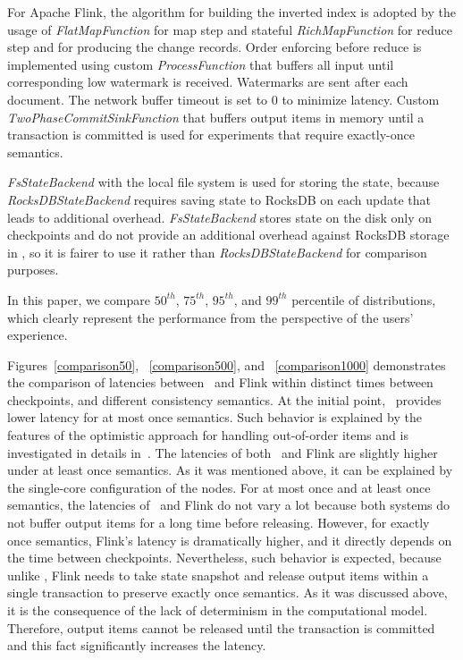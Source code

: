For Apache Flink, the algorithm for building the inverted index is adopted by the usage of {\it FlatMapFunction} for map step and stateful {\it RichMapFunction} for reduce step and for producing the change records. Order enforcing before reduce is implemented using custom {\it ProcessFunction} that buffers all input until corresponding low watermark is received. Watermarks are sent after each document. The network buffer timeout is set to 0 to minimize latency. Custom {\it TwoPhaseCommitSinkFunction} that buffers output items in memory until a transaction is committed is used for experiments that require exactly-once semantics. 

{\it FsStateBackend} with the local file system is used for storing the state, because {\it RocksDBStateBackend} requires saving state to RocksDB on each update that leads to additional overhead. {\it FsStateBackend} stores state on the disk only on checkpoints and do not provide an additional overhead against RocksDB storage in \FlameStream, so it is fairer to use it rather than {\it RocksDBStateBackend} for comparison purposes.

In this paper, we compare $50^{th}$, $75^{th}$, $95^{th}$, and $99^{th}$ percentile of distributions, which clearly represent the performance from the perspective of the users' experience.

Figures~\ref{comparison50}, ~\ref{comparison500}, and ~\ref{comparison1000} demonstrates the comparison of latencies between \FlameStream\ and Flink within distinct times between checkpoints, and different consistency semantics. At the initial point, \FlameStream\ provides lower latency for at most once semantics. Such behavior is explained by the features of the optimistic approach for handling out-of-order items and is investigated in details in~\cite{hiddenSeim}. The latencies of both \FlameStream\ and Flink are slightly higher under at least once semantics. As it was mentioned above, it can be explained by the single-core configuration of the nodes. For at most once and at least once semantics, the latencies of \FlameStream\ and Flink do not vary a lot because both systems do not buffer output items for a long time before releasing. However, for exactly once semantics, Flink's latency is dramatically higher, and it directly depends on the time between checkpoints. Nevertheless, such behavior is expected, because unlike \FlameStream, Flink needs to take state snapshot and release output items within a single transaction to preserve exactly once semantics. As it was discussed above, it is the consequence of the lack of determinism in the computational model. Therefore, output items cannot be released until the transaction is committed and this fact significantly increases the latency. 

